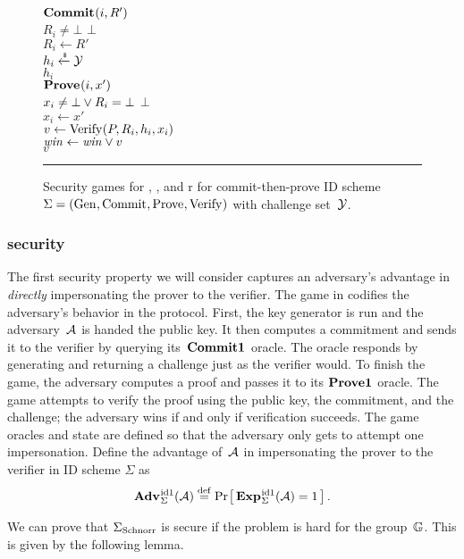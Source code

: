 \documentclass{article}
\theoremstyle{remark}
\begin{document}
\begin{figure}
{    \fu $\textup{\textbf{Commit}}\hspace{0.5pt}(i,R')$\\[2pt]
      \li \rif $R_i\ne\bot$ \rthen \rreturn $\bot$\\
      \li $R_i \gets R'$\\
      \li $h_i \xleftarrow{\text{\tiny{\$}}} \mathcal{Y}$\\
      \li \rreturn $h_i$
    \\[6pt]
    \fu $\textup{\textbf{Prove}}\hspace{0.5pt}(i,x')$\\[2pt]
      \li \rif $x_i\ne\bot \vee R_i=\bot$ \rthen \rreturn $\bot$\\
      \li $x_i \gets x'$\\
      \li $v \gets \textnormal{Verify}\hspace{0.33pt}(P,R_i,h_i,x_i)$\\
      \li $\mathit{win} \gets \mathit{win} \vee v$\\
      \li \rreturn $v$
  }
  \caption{Security games for , , and r for commit-then-prove
  ID scheme $\Sigma = (\textnormal{Gen}\hspace{0.33pt},\textnormal{Commit}\hspace{0.33pt},\textnormal{Prove}\hspace{0.33pt},\textnormal{Verify}\hspace{0.33pt})$ with challenge set~$\mathcal{Y}$.}
  \label{fig:id1}
  \label{fig:id2}
  \label{fig:rid2}
  \vspace{6pt}\hrule
\end{figure}

\subsubsection{ security}
%
The first security property we will consider captures an adversary's advantage
in \emph{directly} impersonating the prover to the verifier.
%
The  game in  codifies the adversary's behavior in the protocol.
First, the key generator is run and the adversary~$\mathcal{A}$ is handed the public key.
%
It then computes a commitment and sends it to the verifier by querying
its~$\textup{\textbf{Commit1}}\hspace{0.5pt}$ oracle. The oracle responds by generating and returning a
challenge just as the verifier would.
%
To finish the game, the adversary computes a proof and passes it to its
$\textup{\textbf{Prove1}}\hspace{0.5pt}$ oracle. The game attempts to verify the proof using the public key,
the commitment, and the challenge; the adversary wins if and only if
verification succeeds. The game oracles and state are defined so that the
adversary only gets to attempt one impersonation.
%
Define the  advantage of~$\mathcal{A}$ in impersonating the prover to the verifier
in ID scheme $\Sigma$ as
%
\[
  \Adv{\id1}_{\Sigma}(\A) \bydef
    \Prob{\Exp{\id1}_{\Sigma}(\A)=1} \,.
\]

We can prove that ${\Sigma_{\mathrm{Schnorr}}}$ is  secure if the \dl problem is hard for the
group~$\mathbb{G}$. This is given by the following lemma.
\end{document}
